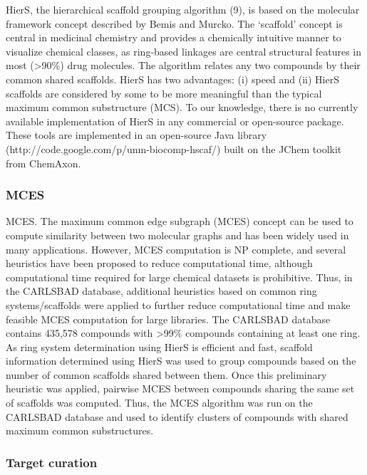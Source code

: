 HierS, the hierarchical scaffold grouping algorithm\cite{Wilkens2005-ja} (9), is based on the molecular framework concept described by Bemis and Murcko\cite{Bemis1996-jg}. The ‘scaffold’ concept is central in medicinal chemistry and provides a chemically intuitive manner to visualize chemical classes, as ring-based linkages are central structural features in most (\textgreater 90\%) drug molecules. The algorithm relates any two compounds by their common shared scaffolds. HierS has two advantages: (i) speed and (ii) HierS scaffolds are considered by some to be more meaningful than the typical maximum common substructure (MCS). To our knowledge, there is no currently available implementation of HierS in any commercial or open-source package. These tools are implemented in an open-source Java library (http://code.google.com/p/unm-biocomp-hscaf/) built on the JChem toolkit from ChemAxon.

\subsubsection{MCES}

MCES. The maximum common edge subgraph (MCES) concept\cite{Raymond2002-ep} can be used to compute similarity between two molecular graphs and has been widely used in many applications\cite{Stahl2005-bl,Sheridan2006-nx,Gardiner2007-ur,Bocker2008-uh,Hariharan2011-qx,Bostrom2012-fb}. However, MCES computation is NP complete, and several heuristics have been proposed to reduce computational time, although computational time required for large chemical datasets is prohibitive. Thus, in the CARLSBAD database, additional heuristics based on common ring systems/scaffolds were applied to further reduce computational time and make feasible MCES computation for large libraries. The CARLSBAD database contains 435,578 compounds with \textgreater99\% compounds containing at least one ring. As ring system determination using HierS is efficient and fast, scaffold information determined using HierS was used to group compounds based on the number of common scaffolds shared between them. Once this preliminary heuristic was applied, pairwise MCES between compounds sharing the same set of scaffolds was computed. Thus, the MCES algorithm was run on the CARLSBAD database and used to identify clusters of compounds with shared maximum common substructures.

\subsubsection{Target curation}

